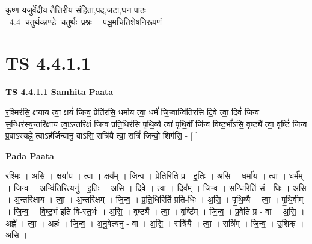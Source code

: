 \documentclass[17pt]{extarticle}
\begin{document}
\begin{titlepage}
    \begin{center}
 
\begin{sanskrit}
    { \Huge
    कृष्ण यजुर्वेदीय तैत्तिरीय संहिता,पद,जटा,घन पाठः 
    }
    \\
    \vspace{2.5cm}
    \mbox{ \Huge
    4.4      चतुर्थकाण्डे चतुर्थः प्रश्नः - पञ्चमचितिशेषनिरूपणं   }
\end{sanskrit}
\end{center}

\end{titlepage}
\tableofcontents
\pagebreak

\section*{ TS 4.4.1.1 }

\textbf{TS 4.4.1.1 } \newline
\textbf{Samhita Paata} \newline

र॒श्मिर॑सि॒ क्षया॑य त्वा॒ क्षयं॑ जिन्व॒ प्रेति॑रसि॒ धर्मा॑य त्वा॒ धर्मं॑ जि॒न्वान्वि॑तिरसि दि॒वे त्वा॒ दिवं॑ जिन्व स॒न्धिर॑स्य॒न्तरि॑क्षाय त्वा॒ऽन्तरि॑क्षं जिन्व प्रति॒धिर॑सि पृथि॒व्यै त्वा॑ पृथि॒वीं जि॑न्व विष्ट॒भों॑ऽसि॒ वृष्ट्यै᳚ त्वा॒ वृष्टिं॑ जिन्व प्र॒वाऽस्यह्ने॒ त्वाऽह॑र्जिन्वानु॒ वाऽसि॒ रात्रि॑यै त्वा॒ रात्रिं॑ जिन्वो॒ शिग॑सि॒ - [  ] \newline

\textbf{Pada Paata} \newline

र॒श्मिः । अ॒सि॒ । क्षया॑य । त्वा॒ । क्षय᳚म् । जि॒न्व॒ । प्रेति॒रिति॒ प्र - इ॒तिः॒ । अ॒सि॒ । धर्मा॑य । त्वा॒ । धर्म᳚म् । जि॒न्व॒ । अन्वि॑ति॒रित्यनु॑ - इ॒तिः॒ । अ॒सि॒ । दि॒वे । त्वा॒ । दिव᳚म् । जि॒न्व॒ । स॒न्धिरिति॑ सं - धिः । अ॒सि॒ । अ॒न्तरि॑क्षाय । त्वा॒ । अ॒न्तरि॑क्षम् । जि॒न्व॒ । प्र॒ति॒धिरिति॑ प्रति-धिः । अ॒सि॒ । पृ॒थि॒व्यै । त्वा॒ । पृ॒थि॒वीम् । जि॒न्व॒ । वि॒ष्ट॒भं इति॑ वि-स्त॒भंः । अ॒सि॒ । वृष्ट्यै᳚ । त्वा॒ । वृष्टि᳚म् । जि॒न्व॒ । प्र॒वेति॑ प्र - वा । अ॒सि॒ । अह्ने᳚ । त्वा॒ । अहः॑ । जि॒न्व॒ । अ॒नु॒वेत्य॑नु - वा । अ॒सि॒ । रात्रि॑यै । त्वा॒ । रात्रि᳚म् । जि॒न्व॒ । उ॒शिक् । अ॒सि॒ ।  \newline




\end{document}
